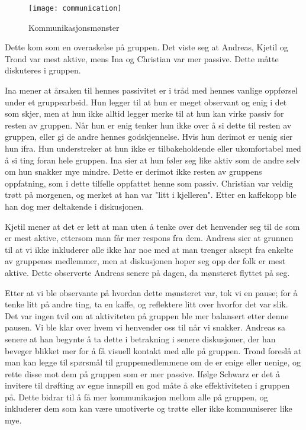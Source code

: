 			\begin{figure} [here]
				\begin{center}
					\texttt{[image: communication]}
				\end{center}
			\caption{Kommunikasjonsmønster}
		\end{figure}
		

	Dette kom som en overaskelse på gruppen. Det viste seg at Andreas, Kjetil og Trond var mest aktive, mens Ina og Christian var mer passive. Dette måtte diskuteres i gruppen.

	Ina mener at årsaken til hennes passivitet er i tråd med hennes vanlige oppførsel under et gruppearbeid. Hun legger til at hun er meget observant og enig i det som skjer, men at hun ikke alltid legger merke til at hun kan virke passiv for resten av gruppen. Når hun er enig tenker hun ikke over å si dette til resten av gruppen, eller gi de andre hennes godskjennelse. Hvis hun derimot er uenig sier hun ifra. Hun understreker at hun ikke er tilbakeholdende eller ukomfortabel med å si ting foran hele gruppen. Ina sier at hun føler seg like aktiv som de andre selv om hun snakker mye mindre. Dette er derimot ikke resten av gruppens oppfatning, som i dette tilfelle oppfattet henne som passiv. Christian var veldig trøtt på morgenen, og merket at han var "litt i kjelleren". Etter en kaffekopp ble han dog mer deltakende i diskusjonen.

	Kjetil mener at det er lett at man uten å tenke over det henvender seg til de som er mest aktive, ettersom man får mer respons fra dem. Andreas sier at grunnen til at vi ikke inkluderer alle ikke har noe med at man trenger aksept fra enkelte av gruppenes medlemmer, men at diskusjonen hoper seg opp der folk er mest aktive. Dette observerte Andreas senere på dagen, da mønsteret flyttet på seg.

	Etter at vi ble observante på hvordan dette mønsteret var, tok vi en pause; for å tenke litt på andre ting, ta en kaffe, og reflektere litt over hvorfor det var slik. Det var ingen tvil om at aktiviteten på gruppen ble mer balansert etter denne pausen. Vi ble klar over hvem vi henvender oss til når vi snakker. Andreas sa senere at han begynte å ta dette i betrakning i senere diskusjoner, der han beveger blikket mer for å få visuell kontakt med alle på gruppen. Trond foreslå at man kan legge til spørsmål til gruppemedlemmene om de er enige eller uenige, og rette disse mot dem på gruppen som er mer passive. Ifølge Schwarz \cite{Schwarz} er det å invitere til drøfting av egne innspill en god måte å øke effektiviteten i gruppen på. Dette bidrar til å få mer kommunikasjon mellom alle på gruppen, og inkluderer dem som kan være umotiverte og trøtte eller ikke kommuniserer like mye. 

